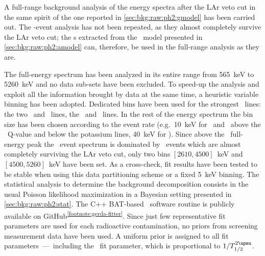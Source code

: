 A full-range background analysis of the energy spectra after the LAr veto cut in the same
spirit of the one reported in \cref{sec:bkg:raw:ph2:gmodel} has been carried out. The
\a-event analysis has not been repeated, as they almost completely survive the LAr veto
cut; the \pdf{}s extracted from the \a\ model presented in \cref{sec:bkg:raw:ph2:amodel} can,
therefore, be used in the full-range analysis as they are.

The full-energy spectrum has been analyzed in its entire range from 565~keV to 5260~keV
and no data sub-sets have been excluded. To speed-up the analysis and exploit all the
information brought by data at the same time, a heuristic variable binning has been
adopted. Dedicated bins have been used for the strongest \g\ lines: the two \kvn\ and
\kvz\ lines, the \Bih\ and \Tl\ lines. In the rest of the energy spectrum the bin size has
been chosen according to the event rate (e.g.~10~keV for \enrBEGeII\ and \enrCoaxII\ above
the \Arl\ Q-value and below the potassium lines, 40~keV for \enrGeII). Since above the
\Tl\ full-energy peak the \Mone\ event spectrum is dominated by \a\ events which are
almost completely surviving the LAr veto cut, only two bins $[2610, 4500]$~keV and $[4500,
5260]$~keV have been set. As a cross-check, fit results have been tested to be stable when
using this data partitioning scheme or a fixed 5~keV binning.
\newpar
The statistical analysis to determine the background decomposition consists in the usual
Poisson likelihood maximization in a Bayesian setting presented in
\cref{sec:bkg:raw:ph2:stat}. The C++ BAT-based~\cite{Caldwell2008} software routine is
publicly available on GitHub\textsuperscript{\ref{footnote:gerda-fitter}}. Since just few
representative fit parameters are used for each radioactive contamination, no priors from
screening measurement data have been used. A uniform prior is assigned to all fit
parameters~---~including the \nnbb\ fit parameter, which is proportional to $1/\thalftwoM$.

